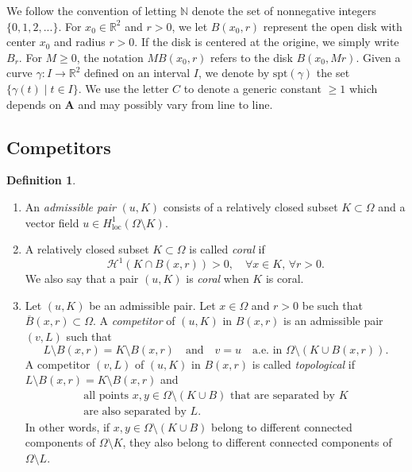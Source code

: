 \documentclass[12pt]{article}
\theoremstyle{definition}
\newtheorem{definition}[theorem]{Definition}
\theoremstyle{remark}
\numberwithin{equation}{section}
\newcommand{\R}{\mathbb{R}}
\newcommand{\N}{\mathbb{N}}
\newcommand{\A}{\mathbf{A}}
\newcommand{\spt}{\mathrm{spt}}
\renewcommand{\H}{\mathcal{H}}
\begin{document}
We follow the convention of letting $\N$ denote the set of nonnegative integers $\{0, 1, 2, ...\}$.
For $x_0\in\R^2$ and $r>0$, we let $B(x_0,r)$ represent the open disk with center $x_0$ and radius $r>0$.
If the disk is centered at the origine, we simply write $B_r$.
For $M \geq 0$, the notation $M B(x_0,r)$ refers to the disk $B(x_0,M r)$. 
Given a curve $\gamma : I \longrightarrow \R^2$ defined on an interval $I$, we denote by $\spt(\gamma)$ the set $\{\gamma(t) \mid t \in I\}$.
We use the letter $C$ to denote a generic constant $\geq 1$ which depends on $\A$ and may possibly vary from line to line.

\subsection{Competitors}

\begin{definition}\strut
    \begin{enumerate}[wide,label=(\alph*)]
        \item An \emph{admissible pair} $(u,K)$ consists of a relatively closed subset $K\subset\Omega$ and a vector
            field $u \in H^1_{\mathrm{loc}}(\Omega \setminus K)$.

        \item A relatively closed subset $K \subset \Omega$ is called \emph{coral} if
            \begin{equation}
                \H^1(K \cap B(x,r))>0, \quad\forall x \in K,\,\forall r>0.
            \end{equation}
            We also say that a pair $(u,K)$ is \emph{coral} when $K$ is coral.

        \item Let $(u,K)$ be an admissible pair.
            Let $x \in \Omega$ and $r > 0$ be such that $\overline{B}(x,r) \subset \Omega$.
            A \emph{competitor} of $(u,K)$ in $B(x,r)$ is an admissible pair $(v,L)$ such that
            \begin{equation}
                L \setminus B(x,r) = K \setminus B(x,r) \quad \text{and} \quad v = u \quad \text{a.e. in } \Omega \setminus \left(K \cup B(x,r)\right).
            \end{equation}
            A competitor $(v,L)$ of $(u,K)$ in $B(x,r)$ is called \emph{topological} if $L \setminus B(x,r) = K \setminus B(x,r)$ and
            \begin{gather}\label{eq_topo_competitor}
                \text{all points $x,y \in \Omega \setminus (K \cup B)$ that are separated by $K$}\\
                \text{are also separated by $L$}.
            \end{gather}
            In other words, if $x,y \in \Omega \setminus (K \cup B)$ belong to different connected components of $\Omega \setminus K$, they also belong to different connected components of $\Omega \setminus L$.
    \end{enumerate}
\end{definition}
\end{document}
